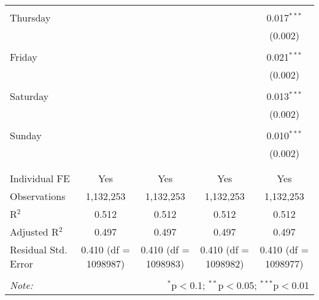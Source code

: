 \documentclass[
]{article}
\begin{document}
\begin{table}[!htbp]
{\begin{tabular}{@{\extracolsep{5pt}}lcccc}
  & & & & \\ 
 Thursday &  &  &  & 0.017$^{***}$ \\ 
  &  &  &  & (0.002) \\ 
  & & & & \\ 
 Friday &  &  &  & 0.021$^{***}$ \\ 
  &  &  &  & (0.002) \\ 
  & & & & \\ 
 Saturday &  &  &  & 0.013$^{***}$ \\ 
  &  &  &  & (0.002) \\ 
  & & & & \\ 
 Sunday &  &  &  & 0.010$^{***}$ \\ 
  &  &  &  & (0.002) \\ 
  & & & & \\ 
\hline \\[-1.8ex] 
Individual FE & Yes & Yes & Yes & Yes \\ 
Observations & 1,132,253 & 1,132,253 & 1,132,253 & 1,132,253 \\ 
R$^{2}$ & 0.512 & 0.512 & 0.512 & 0.512 \\ 
Adjusted R$^{2}$ & 0.497 & 0.497 & 0.497 & 0.497 \\ 
Residual Std. Error & 0.410 (df = 1098987) & 0.410 (df = 1098983) & 0.410 (df = 1098982) & 0.410 (df = 1098977) \\ 
\hline 
\hline \\[-1.8ex] 
\textit{Note:}  & \multicolumn{4}{r}{$^{*}$p$<$0.1; $^{**}$p$<$0.05; $^{***}$p$<$0.01} \\ 
\end{tabular}
} 
\end{table} 
\newpage
\end{document}
